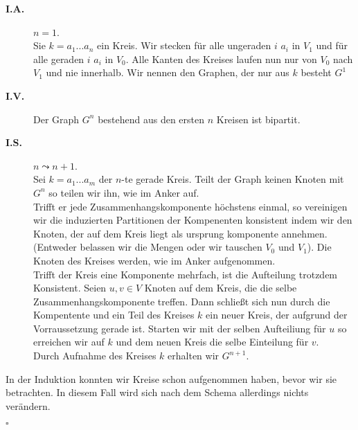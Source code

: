\documentclass[11pt,a4paper,ngerman]{article}
\begin{document}
\begin{description}
   \item[\bfseries I.A.] $n = 1$.\\
      Sie $k = a_1 ... a_n$ ein Kreis.
      Wir stecken für alle ungeraden $i$ $a_i$ in $V_1$ und
      für alle geraden $i$ $a_i$ in $V_0$. Alle Kanten des Kreises
      laufen nun nur von $V_0$ nach $V_1$ und nie innerhalb.
      Wir nennen den Graphen, der nur aus $k$ besteht $G^1$
   \item[\bfseries I.V.] Der Graph $G^n$ bestehend aus den ersten
      $n$ Kreisen ist bipartit.
   \item[\bfseries I.S.] $n \leadsto n+1$.\\
     Sei $k = a_1 ... a_m$ der $n$-te gerade Kreis.
     Teilt der Graph keinen Knoten mit $G^n$ so teilen wir ihn, wie im Anker
     auf.\\
     Trifft er jede Zusammenhangskomponente höchstens einmal, so
     vereinigen wir die induzierten Partitionen der Kompenenten konsistent
     indem wir den Knoten, der auf dem Kreis liegt als ursprung komponente
     annehmen. (Entweder belassen wir die Mengen oder wir tauschen $V_0$ und
     $V_1$). Die Knoten des Kreises werden, wie im Anker aufgenommen.\\

     Trifft der Kreis eine Komponente mehrfach, ist die Aufteilung trotzdem
     Konsistent.
     Seien $u, v \in V$ Knoten auf dem Kreis, die die selbe
     Zusammenhangskomponente treffen. Dann schließt sich nun
     durch die Kompentente und ein Teil des Kreises $k$ ein neuer Kreis,
     der aufgrund der Vorraussetzung gerade ist.
     Starten wir mit der selben Aufteiliung für $u$ so erreichen wir auf
     $k$ und dem neuen Kreis die selbe Einteilung für $v$.\\

     Durch Aufnahme des Kreises $k$ erhalten wir $G^{n+1}$.
\end{description}

In der Induktion konnten wir Kreise schon aufgenommen haben, bevor wir sie betrachten. In diesem Fall wird sich nach dem Schema allerdings nichts verändern.

\mbox{}\hfill$\square$

\label{LastPage}
\end{document}
